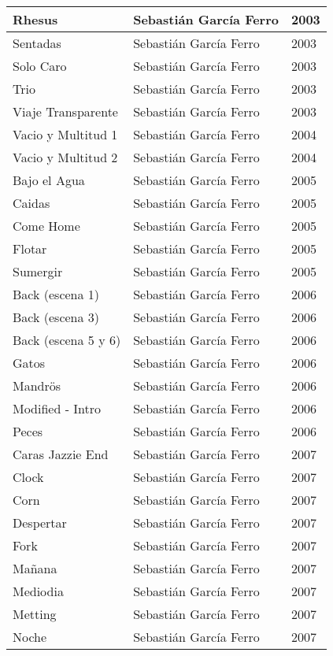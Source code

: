 \begin{center}
\begin{longtable}{| p{} | p{} | p{} |}
Rhesus & Sebastián García Ferro & 2003 \\ \hline 
Sentadas & Sebastián García Ferro & 2003 \\ \hline 
Solo Caro & Sebastián García Ferro & 2003 \\ \hline 
Trio & Sebastián García Ferro & 2003 \\ \hline 
Viaje Transparente & Sebastián García Ferro & 2003 \\ \hline 
Vacio y Multitud 1 & Sebastián García Ferro & 2004 \\ \hline 
Vacio y Multitud 2 & Sebastián García Ferro & 2004 \\ \hline 
Bajo el Agua & Sebastián García Ferro & 2005 \\ \hline 
Caidas & Sebastián García Ferro & 2005 \\ \hline 
Come Home & Sebastián García Ferro & 2005 \\ \hline 
Flotar & Sebastián García Ferro & 2005 \\ \hline 
Sumergir & Sebastián García Ferro & 2005 \\ \hline 
Back (escena 1) & Sebastián García Ferro & 2006 \\ \hline 
Back (escena 3) & Sebastián García Ferro & 2006 \\ \hline 
Back (escena 5 y 6) & Sebastián García Ferro & 2006 \\ \hline 
Gatos & Sebastián García Ferro & 2006 \\ \hline 
Mandrös & Sebastián García Ferro & 2006 \\ \hline 
Modified - Intro & Sebastián García Ferro & 2006 \\ \hline 
Peces & Sebastián García Ferro & 2006 \\ \hline 
Caras Jazzie End & Sebastián García Ferro & 2007 \\ \hline 
Clock & Sebastián García Ferro & 2007 \\ \hline 
Corn & Sebastián García Ferro & 2007 \\ \hline 
Despertar & Sebastián García Ferro & 2007 \\ \hline 
Fork & Sebastián García Ferro & 2007 \\ \hline 
Mañana & Sebastián García Ferro & 2007 \\ \hline 
Mediodia & Sebastián García Ferro & 2007 \\ \hline 
Metting & Sebastián García Ferro & 2007 \\ \hline 
Noche & Sebastián García Ferro & 2007 \\ \hline 

\end{longtable}
\end{center}
